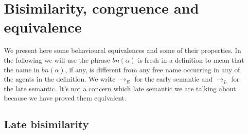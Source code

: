 \begin{definition}
\begin{table}
    \caption{$\pi$ calculus late semantic for normal forms. Every process in the head of a transition in the premise of a rule is in normal form. The restrictions can be empty. When we write $(\nu \tilde{x})P$ n.f. it means that $P$ has no restriction at the top level. Commutative counterpart of rule $ParL$, $SumL$, $EComL$ are omitted. Also in rules for prefix $P$ is a normal form}
    \label{piNorm}
  \end{table}
\end{definition}



\section{Bisimilarity, congruence and equivalence}

We present here some behavioural equivalences and some of their properties. In the following we will use the phrase $bn(\alpha)$ is fresh in a definition to mean that the name in $bn(\alpha)$, if any, is different from any free name occurring in any of the agents in the definition. We write $\rightarrow_{E}$ for the early semantic and $\rightarrow_{L}$ for the late semantic. It's not a concern which late semantic we are talking about because we have proved them equivalent.


\subsection{Late bisimilarity}

